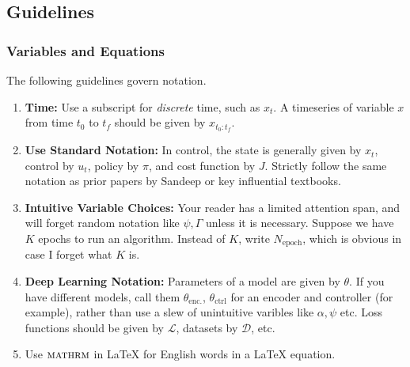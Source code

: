 \subsection{Guidelines}

\subsubsection{Variables and Equations}

The following guidelines govern notation.

\begin{enumerate}
    \item \textbf{Time: } Use a subscript for \textit{discrete} time, such as $x_t$. A timeseries of variable $x$ from time $t_0$ to $t_f$ should be given by $x_{t_0:t_f}$.
    \item \textbf{Use Standard Notation: } In control, the state is generally given by $x_t$, control by $u_t$, policy by $\pi$, and cost function by $J$. Strictly follow the same notation as prior papers by Sandeep or key influential textbooks.
    \item \textbf{Intuitive Variable Choices: } Your reader has a limited attention span, and will forget random notation like $\psi, \Gamma$ unless it is necessary. Suppose we have $K$ epochs to run an algorithm. Instead of $K$, write $N_{\mathrm{epoch}}$, which is obvious in case I forget what $K$ is.
    \item \textbf{Deep Learning Notation: } Parameters of a model are given by $\theta$. If you have different models, call them $\theta_{\mathrm{enc.}}$, $\theta_{\mathrm{ctrl}}$ for an encoder and controller (for example), rather than use a slew of unintuitive varibles like $\alpha, \psi$ etc. Loss functions should be given by $\mathcal{L}$, datasets by $\mathcal{D}$, etc.
    \item Use $\textsc{mathrm}$ in LaTeX for English words in a LaTeX equation.
\end{enumerate}



